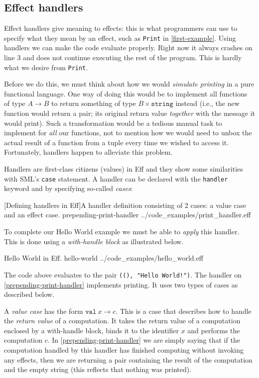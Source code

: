 \documentclass[class=article, crop=false]{standalone}
\begin{document}
\subsection{Effect handlers}

Effect handlers give meaning to effects: this is what programmers can use to
specify what they mean by an effect, such as \lstinline{Print} in
\autoref{first-example}. Using handlers we can make the code evaluate properly.
Right now it always crashes on line 3 and does not continue executing the rest
of the program. This is hardly what we desire from \lstinline{Print}.

Before we do this, we must think about how we would \emph{simulate printing} in
a pure functional language. One way of doing this would be to implement all
functions of type $A \to B$ to return something of type $B \times \mathtt{string}$
instead (i.e., the new function would return a pair; its original return value
\emph{together} with the message it would print). Such a transformation would be
a tedious manual task to implement for \emph{all} our functions, not to mention
how we would need to unbox the actual result of a function from a tuple every
time we wished to access it. Fortunately, handlers happen to alleviate this
problem.

Handlers are first-class citizens (values) in Eff and they show some similarities
with SML's \lstinline|case| statement. A handler can be declared with the
\lstinline|handler| keyword and by specifying so-called \emph{cases}:

{[Defining handlers in Eff]A handler definition consisting of 2 cases: a value case and an effect case.}
{prepending-print-handler}
{../code_examples/print_handler.eff}

To complete our Hello World example we must be able to \emph{apply} this handler.
This is done using a \emph{with-handle block} as illustrated below.

{Hello World in Eff.}
{hello-world}
{../code_examples/hello_world.eff}

The code above evaluates to the pair \texttt{((), "Hello World!")}. The handler
on \autoref{prepending-print-handler} implements printing. It uses two types of
cases as described below.

A \emph{value case} has the form $\mathtt{val}\ x \to c$. This is a case that
describes how to handle the \emph{return value} of a computation. It takes the
return value of a computation enclosed by a with-handle block, binds it to the
identifier $x$ and performs the computation $c$. In \autoref{prepending-print-handler}
we are simply saying that if the computation handled by this handler has finished
computing without invoking any effects, then we are returning a pair containing
the result of the computation and the empty string (this reflects that nothing
was printed).
\end{document}
